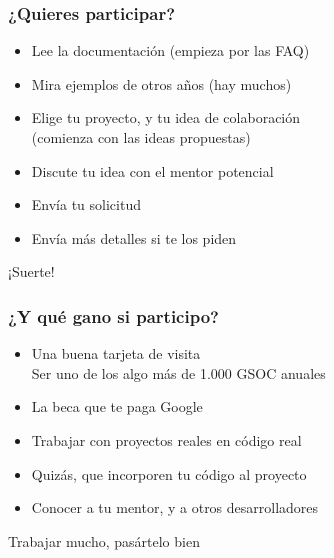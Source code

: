 \begin{frame}
\frametitle{¿Quieres participar?}

{\Large

\begin{itemize}
\item Lee la documentación (empieza por las FAQ)
\item Mira ejemplos de otros años (hay muchos)
\item Elige tu proyecto, y tu idea de colaboración \\
  (comienza con las ideas propuestas)
\item Discute tu idea con el mentor potencial
\item Envía tu solicitud
\item Envía más detalles si te los piden
\end{itemize}

\begin{center}
¡Suerte!
\end{center}
}

\end{frame}

\begin{frame}
\frametitle{¿Y qué gano si participo?}

{\Large

\begin{itemize}
\item Una buena tarjeta de visita \\
  Ser uno de los algo más de 1.000 GSOC anuales
\item La beca que te paga Google
\item Trabajar con proyectos reales en código real
\item Quizás, que incorporen tu código al proyecto
\item Conocer a tu mentor, y a otros desarrolladores
\end{itemize}

\begin{center}
Trabajar mucho, pasártelo bien
\end{center}
}

\end{frame}

